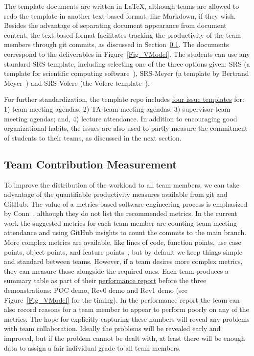 \documentclass[10pt, conference]{IEEEtran}
\begin{document}
The template documents are written in \LaTeX, although teams are allowed to redo
the template in another text-based format, like Markdown, if they wish. Besides
the advantage of separating document appearance from document content, the
text-based format facilitates tracking the productivity of the team members
through git commits, as discussed in Section~\ref{Sec_TeamContribMeasure}. The
documents correspond to the deliverables in Figure~\ref{Fig_VModel}. The
students can use any standard SRS template, including selecting one of the three
options given: SRS (a template for scientific computing
software~\cite{SmithAndLai2005}), SRS-Meyer (a template by Bertrand
Meyer~\cite{Meyer2022}) and SRS-Volere (the Volere
template~\cite{RobertsonAndRobertson1999Vol}).

For further standardization, the template repo includes
\href{Redact link}
{four issue templates} for: 1) team meeting agendas; 2) TA-team meeting agendas;
3) supervisor-team meeting agendas; and, 4) lecture attendance.  In addition to
encouraging good organizational habits, the issues are also used to partly
measure the commitment of students to their teams, as discussed in the next
section.

\subsection{Team Contribution Measurement} \label{Sec_TeamContribMeasure}

To improve the distribution of the workload to all team members, we can take
advantage of the quantifiable productivity measures available from git and
GitHub.  The value of a metrics-based software engineering process is emphasized
by Conn~\cite{connReusableAcademicstrengthMetricsbased2004}, although they do
not list the recommended metrics.  In the current work the suggested metrics for
each team member are counting team meeting attendance and using GitHub insights
to count the commits to the main branch.  More complex metrics are available,
like lines of code, function points, use case points, object points, and feature
points~\cite{sudhakarMeasuringProductivitySoftware2012}, but by default we keep
things simple and standard between teams.  However, if a team desires more
complex metrics, they can measure those alongside the required ones. Each team
produces a summary table as part of their \href{REDACT LINK}  
{performance report} before the three demonstrations: POC demo, Rev0 demo and
Rev1 demo (see Figure~\ref{Fig_VModel} for the timing). In the performance
report the team can also record reasons for a team member to appear to perform
poorly on any of the metrics. The hope for explicitly capturing these numbers
will reveal any problems with team collaboration.  Ideally the problems will be
revealed early and improved, but if the problem cannot be dealt with, at least
there will be enough data to assign a fair individual grade to all team members.
\end{document}
